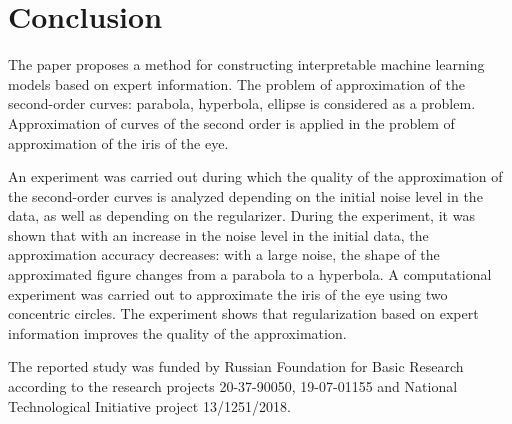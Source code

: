 \section{Conclusion}
\label{sec:6}
The paper proposes a method for constructing interpretable machine learning models based on expert information. The problem of approximation of the second-order curves: parabola, hyperbola, ellipse is considered as a problem. Approximation of curves of the second order is applied in the problem of approximation of the iris of the eye.

An experiment was carried out during which the quality of the approximation of the second-order curves is analyzed depending on the initial noise level in the data, as well as depending on the regularizer. During the experiment, it was shown that with an increase in the noise level in the initial data, the approximation accuracy decreases: with a large noise, the shape of the approximated figure changes from a parabola to a hyperbola.
A computational experiment was carried out to approximate the iris of the eye using two concentric circles. The experiment shows that regularization based on expert information improves the quality of the approximation.

\begin{acknowledgements}
The reported study was funded by Russian Foundation for Basic Research according to the research projects 20-37-90050, 19-07-01155 and National Technological Initiative project 13/1251/2018.
\end{acknowledgements}




%
%



